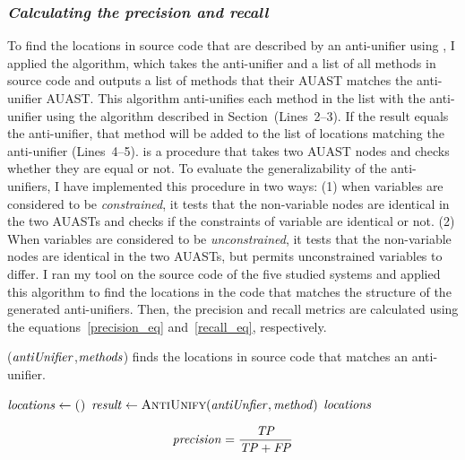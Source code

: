 \subsubsection{\emph{Calculating the precision and recall}}  \label{precision}
To find the locations in source code that are described by an anti-unifier using , I applied the  algorithm, which takes the anti-unifier and a list of all methods in source code and outputs a list of methods that their AUAST matches the anti-unifier AUAST. This algorithm anti-unifies each method in the list with the anti-unifier using the  algorithm described in Section~\label{meth-antiUnifier}(Lines~2--3). If the result equals the anti-unifier, that method will be added to the list of locations matching the anti-unifier (Lines~4--5).  is a procedure that takes two AUAST nodes and checks whether they are equal or not. To evaluate the generalizability of the anti-unifiers, I have implemented this procedure in two ways: (1) when variables are considered to be \emph{constrained}, it tests that the non-variable nodes are identical in the two AUASTs and checks if the constraints of variable are identical or not. (2) When variables are considered to be \emph{unconstrained}, it tests that the non-variable nodes are identical in the two AUASTs, but permits unconstrained variables to differ. I ran my tool on the source code of the five studied systems and applied this algorithm to find the locations in the code that matches the structure of the generated anti-unifiers. Then, the precision and recall metrics are calculated using the equations~\ref{precision_eq} and~\ref{recall_eq}, respectively.


\begin{algorithm}
\caption{($\mathit{antiUnifier}$,$\mathit{methods}$) finds the locations in source code that matches an anti-unifier.}
\label{alg-determine}
\begin{algorithmic}[1]
\DetermineLocations
    \State $\mathit{locations} \gets \textsc{()}$
    \State $\mathit{result} \gets  \textsc{AntiUnify}(\mathit{antiUnfier},\mathit{method})$
		\EndIf 		
		\EndFor
 \Return $\mathit{locations} $  	
  \end{algorithmic}
\end{algorithm}

\begin{equation}\label{precision_eq}
\mathit{precision} = \frac{\mathit{TP}}{{\mathit{TP}+\mathit{FP}}}
\end{equation}


